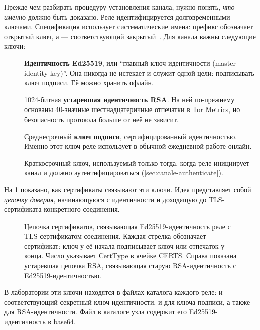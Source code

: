 Прежде чем разбирать процедуру установления канала, нужно понять, \emph{что именно} должно быть доказано. Реле идентифицируется долговременными ключами. Спецификация использует систематические имена: префикс  обозначает открытый ключ, а  --- соответствующий закрытый~. Для канала важны следующие ключи:

\begin{description}
  \item[] \textbf{Идентичность Ed25519}, или \enquote{главный ключ идентичности (master identity key)}. Она никогда не истекает и служит одной цели: подписывать ключ подписи. Её можно хранить офлайн.
  \item[] 1024-битная \textbf{устаревшая идентичность RSA}. На ней по-прежнему основаны 40-значные шестнадцатеричные отпечатки в Tor Metrics, но безопасность протокола больше от неё не зависит.
  \item[] Среднесрочный \textbf{ключ подписи}, сертифицированный идентичностью. Именно этот ключ реле использует в обычной ежедневной работе онлайн.
  \item[] Краткосрочный ключ, используемый только тогда, когда реле инициирует канал и должно аутентифицироваться (\cref{sec:canale-authenticate}).
\end{description}

На \cref{fig:chiavi-relay} показано, как сертификаты связывают эти ключи. Идея представляет собой \emph{цепочку доверия}, начинающуюся с идентичности и доходящую до TLS-сертификата конкретного соединения.

\begin{figure}[htbp]
\centering

\caption{Цепочка сертификатов, связывающая Ed25519-идентичность реле с TLS-сертификатом соединения. Каждая стрелка обозначает сертификат: ключ у её начала подписывает ключ или отпечаток у конца. Число указывает CertType в ячейке CERTS. Справа показана устаревшая цепочка RSA, связывающая старую RSA-идентичность с Ed25519-идентичностью.}
\label{fig:chiavi-relay}
\end{figure}

В лаборатории эти ключи находятся в файлах каталога  каждого реле:  и соответствующий секретный ключ идентичности,  и  для ключа подписи, а также  для RSA-идентичности. Файл  в каталоге узла содержит его Ed25519-идентичность в base64.

